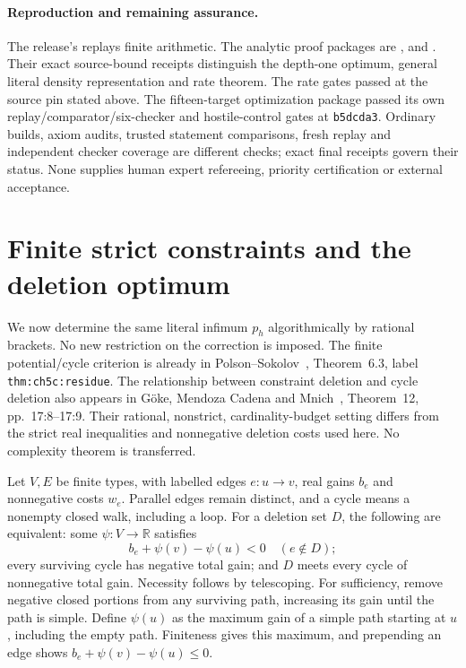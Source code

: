 \documentclass[11pt,letterpaper]{article}
\newcommand{\RR}{\mathbb{R}}
\begin{document}
\paragraph{Reproduction and remaining assurance.}
The release's  replays finite
arithmetic. The analytic proof packages are
,  and
. Their exact source-bound receipts distinguish the
depth-one optimum, general literal density representation and rate theorem.
The rate gates passed at the source pin stated above. The fifteen-target
optimization package passed its own replay/comparator/six-checker and
hostile-control gates at \texttt{b5dcda3}. Ordinary builds, axiom audits, trusted
statement comparisons, fresh replay and independent checker coverage are
different checks; exact final receipts govern their status. None supplies
human expert refereeing, priority certification or external acceptance.

\section{Finite strict constraints and the deletion optimum}\label{sec:finite-optimization}
We now determine the same literal infimum $p_h$ algorithmically by rational
brackets. No new restriction on the correction is imposed. The finite
potential/cycle criterion is already in Polson--Sokolov~\cite{polson},
Theorem~6.3, label \texttt{thm:ch5c:residue}. The relationship between
constraint deletion and cycle deletion also appears in G\"oke, Mendoza Cadena
and Mnich~\cite{goke}, Theorem~12, pp.~17:8--17:9. Their rational, nonstrict,
cardinality-budget setting differs from the strict real inequalities and
nonnegative deletion costs used here. No complexity theorem is transferred.

Let $V,E$ be finite types, with labelled edges $e:u\to v$, real gains $b_e$
and nonnegative costs $w_e$. Parallel edges remain distinct, and a cycle
means a nonempty closed walk, including a loop. For a deletion set $D$, the
following are equivalent: some $\psi:V\to\RR$ satisfies
\[
 b_e+\psi(v)-\psi(u)<0\quad(e\notin D);
\]
every surviving cycle has negative total gain; and $D$ meets every cycle of
nonnegative total gain. Necessity follows by telescoping. For sufficiency,
remove negative closed portions from any surviving path, increasing its gain
until the path is simple. Define $\psi(u)$ as the maximum gain of a simple
path starting at $u$, including the empty path. Finiteness gives this maximum,
and prepending an edge shows $b_e+\psi(v)-\psi(u)\le0$.
\end{document}
